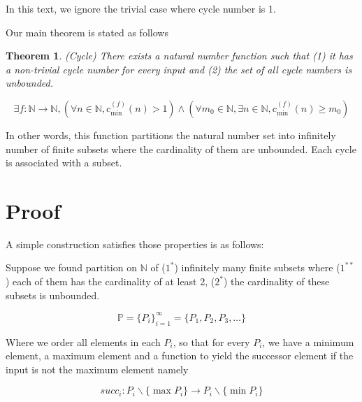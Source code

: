 \documentclass{article}
\newtheorem{theorem}{Theorem}
\begin{document}
    In this text, we ignore the trivial case where cycle number is 1.

    Our main theorem is stated as follows

    \begin{theorem}(Cycle)
        There exists a natural number function such that (1) it has a non-trivial cycle number for every input and (2) the set of all cycle numbers is unbounded.

        \begin{equation}
            \label{eq:cycle_theorem}
            \exists f : \mathbb{N} \to \mathbb{N}, (
            \forall n \in \mathbb{N},
            c^{(f)}_{\min}(n) > 1
            ) \land (
            \forall m_0 \in \mathbb{N},
            \exists n \in \mathbb{N},
            c^{(f)}_{\min}(n) \geq m_0
            )
        \end{equation}
    \end{theorem}

    In other words, this function partitions the natural number set into infinitely number of finite subsets where the cardinality of them are unbounded.
    Each cycle is associated with a subset.


    \section{Proof}\label{sec:proof}

    A simple construction satisfies those properties is as follows:

    Suppose we found partition on $\mathbb{N}$ of ($1^*$) infinitely many finite subsets where ($1^{**}$) each of them has the cardinality of at least 2, ($2^*$) the cardinality of these subsets is unbounded.

    \begin{equation}
        \label{eq:partition}
        \mathbb{P} = \{ P_i \}_{i=1}^\infty = \{ P_1, P_2, P_3, \dots \}
    \end{equation}

    Where we order all elements in each $P_i$, so that for every $P_i$, we have a minimum element, a maximum element and a function to yield the successor element if the input is not the maximum element namely

    \begin{equation}
        \label{eq:succ_func}
        succ_i : P_i \backslash \{ \max{P_i} \} \to P_i \backslash \{ \min{P_i} \}
    \end{equation}
\end{document}
